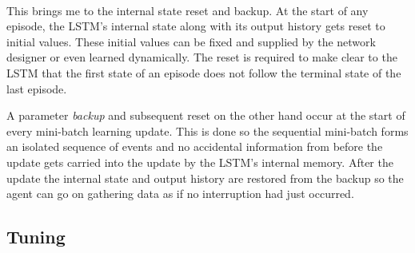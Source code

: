 \paragraph{}
This brings me to the internal state reset and backup.
At the start of any episode,
the LSTM's internal state along with its output history
gets reset to initial values.
These initial values can be fixed and supplied
by the network designer
or even learned dynamically.
The reset is required to make clear to the LSTM
that the first state of an episode
does not follow the terminal state of the last episode.

A parameter \textit{backup} and subsequent reset
on the other hand
occur at the start of every mini-batch learning update.
This is done so the sequential mini-batch
forms an isolated sequence of events
and no accidental information from before the update gets carried into the update
by the LSTM's internal memory.
After the update
the internal state and output history
are restored from the backup
so the agent can go on gathering data
as if no interruption had just occurred.

\subsection{Tuning}
\label{sub:lstm_tuning}

